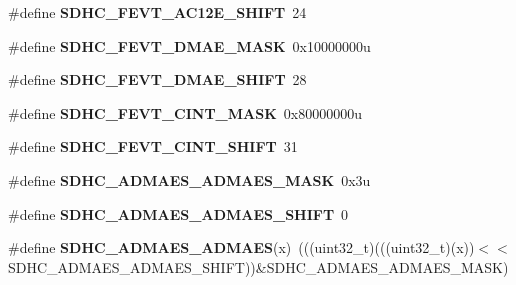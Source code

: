 \begin{DoxyCompactItemize}
\item 
\#define {\bfseries S\+D\+H\+C\+\_\+\+F\+E\+V\+T\+\_\+\+A\+C12\+E\+\_\+\+S\+H\+I\+FT}~24\hypertarget{group__SDHC__Register__Masks_ga932a5cd108d0f4bf80df9559c2c671e2}{}\label{group__SDHC__Register__Masks_ga932a5cd108d0f4bf80df9559c2c671e2}

\item 
\#define {\bfseries S\+D\+H\+C\+\_\+\+F\+E\+V\+T\+\_\+\+D\+M\+A\+E\+\_\+\+M\+A\+SK}~0x10000000u\hypertarget{group__SDHC__Register__Masks_gad91681b40c16fc4d1fcefe155d3437cb}{}\label{group__SDHC__Register__Masks_gad91681b40c16fc4d1fcefe155d3437cb}

\item 
\#define {\bfseries S\+D\+H\+C\+\_\+\+F\+E\+V\+T\+\_\+\+D\+M\+A\+E\+\_\+\+S\+H\+I\+FT}~28\hypertarget{group__SDHC__Register__Masks_ga5899ac8c06de1bf1164fb10a8ee67bde}{}\label{group__SDHC__Register__Masks_ga5899ac8c06de1bf1164fb10a8ee67bde}

\item 
\#define {\bfseries S\+D\+H\+C\+\_\+\+F\+E\+V\+T\+\_\+\+C\+I\+N\+T\+\_\+\+M\+A\+SK}~0x80000000u\hypertarget{group__SDHC__Register__Masks_gab421860ddd2b50ee334649e5cf9f4475}{}\label{group__SDHC__Register__Masks_gab421860ddd2b50ee334649e5cf9f4475}

\item 
\#define {\bfseries S\+D\+H\+C\+\_\+\+F\+E\+V\+T\+\_\+\+C\+I\+N\+T\+\_\+\+S\+H\+I\+FT}~31\hypertarget{group__SDHC__Register__Masks_ga0eb0abd3e2107c4b5d2dc801b3b1a067}{}\label{group__SDHC__Register__Masks_ga0eb0abd3e2107c4b5d2dc801b3b1a067}

\item 
\#define {\bfseries S\+D\+H\+C\+\_\+\+A\+D\+M\+A\+E\+S\+\_\+\+A\+D\+M\+A\+E\+S\+\_\+\+M\+A\+SK}~0x3u\hypertarget{group__SDHC__Register__Masks_gaaf2deb9a73e0aeecdc0ee08497d0165b}{}\label{group__SDHC__Register__Masks_gaaf2deb9a73e0aeecdc0ee08497d0165b}

\item 
\#define {\bfseries S\+D\+H\+C\+\_\+\+A\+D\+M\+A\+E\+S\+\_\+\+A\+D\+M\+A\+E\+S\+\_\+\+S\+H\+I\+FT}~0\hypertarget{group__SDHC__Register__Masks_ga3cc649f6ebd779dc84337a9bc5ae5c0d}{}\label{group__SDHC__Register__Masks_ga3cc649f6ebd779dc84337a9bc5ae5c0d}

\item 
\#define {\bfseries S\+D\+H\+C\+\_\+\+A\+D\+M\+A\+E\+S\+\_\+\+A\+D\+M\+A\+ES}(x)~(((uint32\+\_\+t)(((uint32\+\_\+t)(x))$<$$<$S\+D\+H\+C\+\_\+\+A\+D\+M\+A\+E\+S\+\_\+\+A\+D\+M\+A\+E\+S\+\_\+\+S\+H\+I\+FT))\&S\+D\+H\+C\+\_\+\+A\+D\+M\+A\+E\+S\+\_\+\+A\+D\+M\+A\+E\+S\+\_\+\+M\+A\+SK)\hypertarget{group__SDHC__Register__Masks_gae961b07d5069efed1d1529e087caab7c}{}\label{group__SDHC__Register__Masks_gae961b07d5069efed1d1529e087caab7c}


\end{DoxyCompactItemize}

